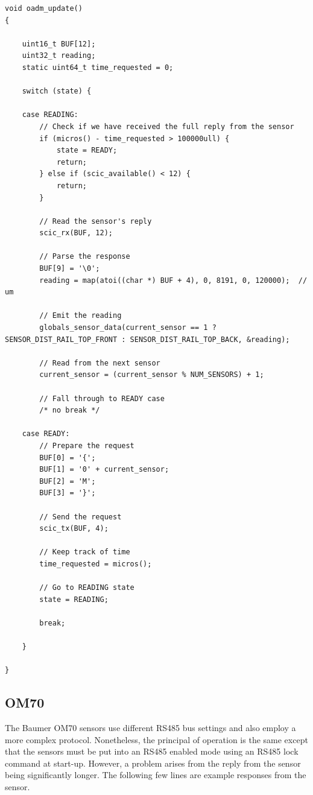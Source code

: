 \begin{verbatim}
void oadm_update()
{

    uint16_t BUF[12];
    uint32_t reading;
    static uint64_t time_requested = 0;

    switch (state) {

    case READING:
        // Check if we have received the full reply from the sensor
        if (micros() - time_requested > 100000ull) {
            state = READY;
            return;
        } else if (scic_available() < 12) {
            return;
        }

        // Read the sensor's reply
        scic_rx(BUF, 12);

        // Parse the response
        BUF[9] = '\0';
        reading = map(atoi((char *) BUF + 4), 0, 8191, 0, 120000);  // um

        // Emit the reading
        globals_sensor_data(current_sensor == 1 ? SENSOR_DIST_RAIL_TOP_FRONT : SENSOR_DIST_RAIL_TOP_BACK, &reading);

        // Read from the next sensor
        current_sensor = (current_sensor % NUM_SENSORS) + 1;

        // Fall through to READY case
        /* no break */

    case READY:
        // Prepare the request
        BUF[0] = '{';
        BUF[1] = '0' + current_sensor;
        BUF[2] = 'M';
        BUF[3] = '}';

        // Send the request
        scic_tx(BUF, 4);

        // Keep track of time
        time_requested = micros();

        // Go to READING state
        state = READING;

        break;

    }

}
\end{verbatim}

\subsection{OM70}

The Baumer OM70 sensors use different RS485 bus settings and also employ a more complex protocol. Nonetheless, the principal of operation is the same except that the sensors must be put into an RS485 enabled mode using an RS485 lock command at start-up. However, a problem arises from the reply from the sensor being significantly longer. The following few lines are example responses from the sensor.

